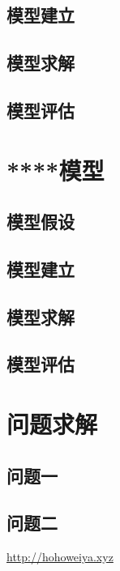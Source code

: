 \documentclass[a4paper,left=2.5cm,right=2.5cm,11pt]{article}
\begin{document}
\begin{spacing}{1.2}
	\subsection{模型建立}
	
	\subsection{模型求解}
	
	\subsection{模型评估}
	\newpage
	\section{****模型}
	
	\subsection{模型假设}
	
	\subsection{模型建立}
	
	\subsection{模型求解}
	
	\subsection{模型评估}
	\newpage
	\section{问题求解}
	\subsection{问题一}
	\subsection{问题二}
	
		
	\end{spacing}
	\newpage
	\begin{thebibliography}{}
	 \url{http://hohoweiya.xyz}
	\end{thebibliography}	
	
\end{document}
